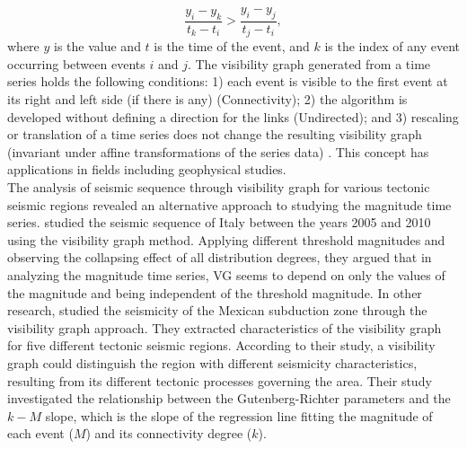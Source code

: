\begin{equation}
\frac{y_i - y_k }{t_k - t_i} > \frac{y_i - y_j}{ t_j - t_i} ,
\end{equation}
\noindent
where $y$ is the value and $t$ is the time of the event, and $k$ is the index of any event occurring between events  $i$  and  $j$. The visibility graph generated from a time series holds the following conditions: 1) each event is visible to the first event at its right and left side (if there is any) (Connectivity); 2) the algorithm is developed without defining a direction for the links (Undirected); and 3) rescaling or translation of a time series does not change the resulting visibility graph (invariant under affine transformations of the series data) \citep{Lacasa2008}. This concept has applications in fields including geophysical studies. \\
\noindent
The analysis of seismic sequence through visibility graph for various tectonic seismic regions revealed an alternative approach to studying the magnitude time series.  \citet{Telesca2012} studied the seismic sequence of Italy between the years 2005 and 2010 using the visibility graph method. Applying different threshold magnitudes and observing the collapsing effect of all distribution degrees, they argued that in analyzing the magnitude time series, VG seems to depend on only the values of the magnitude and being independent of the threshold magnitude. 
\noindent
In other research, \citet{Telesca2013} studied the seismicity of the Mexican subduction zone through the visibility graph approach. They extracted characteristics of the visibility graph for five different tectonic seismic regions.  According to their study, a visibility graph could distinguish the region with different seismicity characteristics, resulting from its different tectonic processes governing the area. Their study investigated the relationship between the Gutenberg-Richter parameters and the $k-M$ slope, which is the slope of the regression line fitting the magnitude of each event  ($M$) and its connectivity degree  ($k$). 
\noindent
